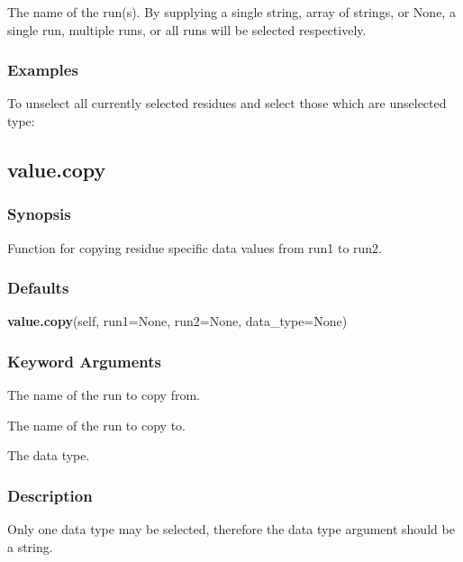   The name of the run(s).  By supplying a single string, array of strings, or None, a single run, multiple runs, or all runs will be selected respectively. 




\subsubsection{Examples}

To unselect all currently selected residues and select those which are unselected type:





\newpage

\subsection{value.copy}


\subsubsection{Synopsis}

Function for copying residue specific data values from run1 to run2.



\subsubsection{Defaults}

\textsf{\textbf{value.copy}(self, run1=None, run2=None, data\_type=None)}


\subsubsection{Keyword Arguments}

  The name of the run to copy from. 

  The name of the run to copy to. 

  The data type. 




\subsubsection{Description}

Only one data type may be selected, therefore the data type argument should be a string.


